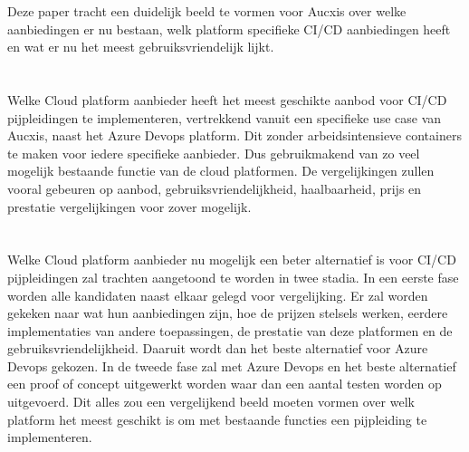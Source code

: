 Deze paper tracht een duidelijk beeld te vormen voor Aucxis over welke aanbiedingen er nu bestaan, welk platform specifieke CI/CD aanbiedingen heeft en wat er nu het meest gebruiksvriendelijk lijkt.


\section{}
\label{sec:onderzoeksvraag}
Welke Cloud platform aanbieder heeft het meest geschikte aanbod voor CI/CD pijpleidingen te implementeren, vertrekkend vanuit een specifieke use case van Aucxis, naast het Azure Devops platform. Dit zonder arbeidsintensieve containers te maken voor iedere specifieke aanbieder. Dus gebruikmakend van zo veel mogelijk bestaande functie van de cloud platformen. De vergelijkingen zullen vooral gebeuren op aanbod, gebruiksvriendelijkheid, haalbaarheid, prijs en prestatie vergelijkingen voor zover mogelijk.


\section{}
\label{sec:onderzoeksdoelstelling}
Welke Cloud platform aanbieder nu mogelijk een beter alternatief is voor CI/CD pijpleidingen zal trachten aangetoond te worden in twee stadia. In een eerste fase worden alle kandidaten naast elkaar gelegd voor vergelijking. Er zal worden gekeken naar wat hun aanbiedingen zijn, hoe de prijzen stelsels werken, eerdere implementaties van andere toepassingen, de prestatie van deze platformen en de gebruiksvriendelijkheid. Daaruit wordt dan het beste alternatief voor Azure Devops gekozen. In de tweede fase zal met Azure Devops en het beste alternatief een proof of concept uitgewerkt worden waar dan een aantal testen worden op uitgevoerd. Dit alles zou een vergelijkend beeld moeten vormen over welk platform het meest geschikt is om met bestaande functies een pijpleiding te implementeren.

